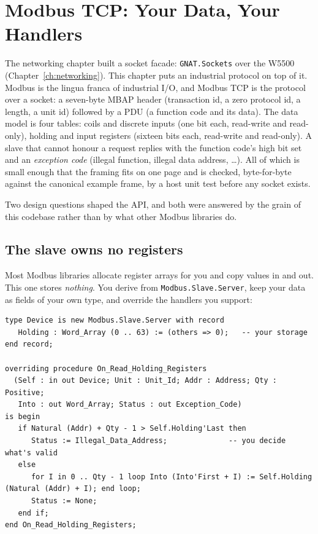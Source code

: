 \chapter{Modbus TCP: Your Data, Your Handlers}
\label{ch:modbus}

The networking chapter built a socket facade: \texttt{GNAT.Sockets} over the
W5500 (Chapter~\ref{ch:networking}). This chapter puts an industrial protocol on
top of it. Modbus is the lingua franca of industrial I/O,
and Modbus TCP is the protocol over a socket: a seven-byte MBAP header (transaction id, a zero protocol id, a
length, a unit id) followed by a PDU (a function code and its data). The data
model is four tables: coils and discrete inputs (one bit each, read-write and
read-only), holding and input registers (sixteen bits each, read-write and
read-only). A slave that cannot honour a request replies with the function code's
high bit set and an \emph{exception code} (illegal function, illegal data
address, \ldots). All of which is small enough that the framing fits on one page
and is checked, byte-for-byte against the canonical example frame, by a host unit
test before any socket exists.

Two design questions shaped the API, and both were answered by the grain of this
codebase rather than by what other Modbus libraries do.

\section{The slave owns no registers}

Most Modbus libraries allocate register arrays for you and copy values in and out.
This one stores \emph{nothing}. You derive from \texttt{Modbus.Slave.Server}, keep
your data as fields of your own type, and override the handlers you support:

\begin{lstlisting}
type Device is new Modbus.Slave.Server with record
   Holding : Word_Array (0 .. 63) := (others => 0);   -- your storage
end record;

overriding procedure On_Read_Holding_Registers
  (Self : in out Device; Unit : Unit_Id; Addr : Address; Qty : Positive;
   Into : out Word_Array; Status : out Exception_Code)
is begin
   if Natural (Addr) + Qty - 1 > Self.Holding'Last then
      Status := Illegal_Data_Address;              -- you decide what's valid
   else
      for I in 0 .. Qty - 1 loop Into (Into'First + I) := Self.Holding (Natural (Addr) + I); end loop;
      Status := None;
   end if;
end On_Read_Holding_Registers;
\end{lstlisting}

